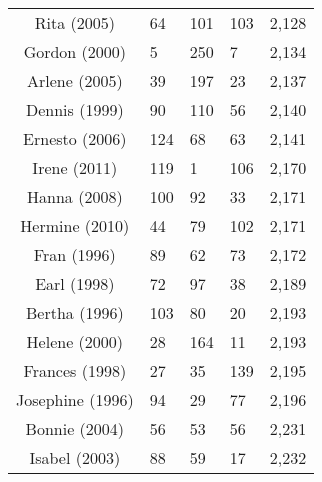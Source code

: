 \begin{table}[ht]
\begin{tabular}{cP{3cm}P{3cm}P{3cm}P{3cm}}
  Rita (2005) & 64 & 101 & 103 & 2,128 \\ 
  Gordon (2000) & 5 & 250 & 7 & 2,134 \\ 
  Arlene (2005) & 39 & 197 & 23 & 2,137 \\ 
  Dennis (1999) & 90 & 110 & 56 & 2,140 \\ 
  Ernesto (2006) & 124 & 68 & 63 & 2,141 \\ 
  Irene (2011) & 119 & 1 & 106 & 2,170 \\ 
  Hanna (2008) & 100 & 92 & 33 & 2,171 \\ 
  Hermine (2010) & 44 & 79 & 102 & 2,171 \\ 
  Fran (1996) & 89 & 62 & 73 & 2,172 \\ 
  Earl (1998) & 72 & 97 & 38 & 2,189 \\ 
  Bertha (1996) & 103 & 80 & 20 & 2,193 \\ 
  Helene (2000) & 28 & 164 & 11 & 2,193 \\ 
  Frances (1998) & 27 & 35 & 139 & 2,195 \\ 
  Josephine (1996) & 94 & 29 & 77 & 2,196 \\ 
  Bonnie (2004) & 56 & 53 & 56 & 2,231 \\ 
  Isabel (2003) & 88 & 59 & 17 & 2,232 \\ 
   \bottomrule
\end{tabular}
\end{table}
